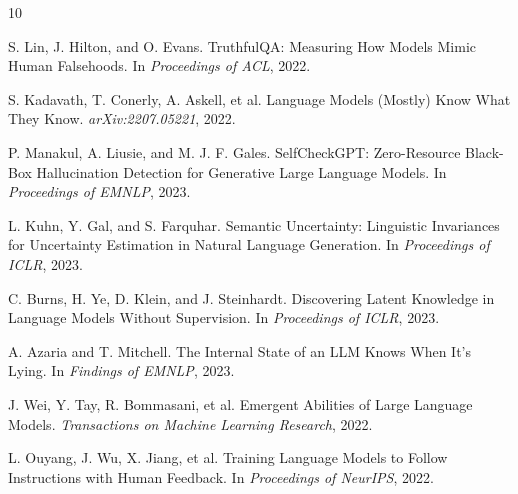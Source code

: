 \documentclass[11pt]{ctexart}
\begin{document}
\begin{thebibliography}{10}

S. Lin, J. Hilton, and O. Evans.
\newblock TruthfulQA: Measuring How Models Mimic Human Falsehoods.
\newblock In \textit{Proceedings of ACL}, 2022.

S. Kadavath, T. Conerly, A. Askell, et al.
\newblock Language Models (Mostly) Know What They Know.
\newblock \textit{arXiv:2207.05221}, 2022.

P. Manakul, A. Liusie, and M. J. F. Gales.
\newblock SelfCheckGPT: Zero-Resource Black-Box Hallucination Detection for Generative Large Language Models.
\newblock In \textit{Proceedings of EMNLP}, 2023.

L. Kuhn, Y. Gal, and S. Farquhar.
\newblock Semantic Uncertainty: Linguistic Invariances for Uncertainty Estimation in Natural Language Generation.
\newblock In \textit{Proceedings of ICLR}, 2023.

C. Burns, H. Ye, D. Klein, and J. Steinhardt.
\newblock Discovering Latent Knowledge in Language Models Without Supervision.
\newblock In \textit{Proceedings of ICLR}, 2023.

A. Azaria and T. Mitchell.
\newblock The Internal State of an LLM Knows When It's Lying.
\newblock In \textit{Findings of EMNLP}, 2023.

J. Wei, Y. Tay, R. Bommasani, et al.
\newblock Emergent Abilities of Large Language Models.
\newblock \textit{Transactions on Machine Learning Research}, 2022.

L. Ouyang, J. Wu, X. Jiang, et al.
\newblock Training Language Models to Follow Instructions with Human Feedback.
\newblock In \textit{Proceedings of NeurIPS}, 2022.

\end{thebibliography}
\end{document}
